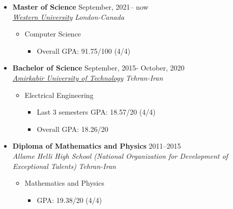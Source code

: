 \documentclass[10pt,a4paper,sans]{moderncv} %
\begin{document}
	\begin{itemize}
	    \item \textbf{Master of Science} \hfill September, 2021-- now \\ 
	\href{https://www.uwo.ca}{ \emph{Western University}} \hfill \emph{London-Canada}
		\begin{itemize}
			\item Computer Science \hspace{10 pt}  \hspace{10 pt}  \hfill
			\begin{itemize}
				\item Overall GPA: 91.75/100 (4/4)
			\end{itemize}
		\end{itemize}
		

		\item \textbf{Bachelor of Science} \hfill September, 2015- October, 2020 \\ 
	\href{http://aut.ac.ir/aut/}{ \emph{Amirkabir University of Technology}} \hfill \emph{Tehran-Iran}
		\begin{itemize}
			\item Electrical Engineering \hspace{10 pt}  \hspace{10 pt}  \hfill  
			\begin{itemize}
				\item Last 3 semesters GPA: 18.57/20 (4/4)
				\item Overall GPA: 18.26/20 
			\end{itemize}
		\end{itemize}
		
		
		\item \textbf{Diploma of Mathematics and Physics} \hfill 2011--2015 \\
		 \emph{Allame Helli High School (National Organization for Development of Exceptional Talents)} \hfill \emph{Tehran-Iran}
		
		\begin{itemize}
			\item Mathematics and Physics
			\begin{itemize}		
				\item GPA: 19.38/20 (4/4)
			\end{itemize}
		\end{itemize}

	\end{itemize}
	
\end{document}
